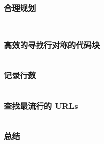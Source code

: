 \documentclass[./main.tex]{subfiles}
\begin{document}
\begin{lstlisting}[language=Haskell]

\end{lstlisting}

\subsubsection*{合理规划}

%

\begin{lstlisting}[language=Haskell]

\end{lstlisting}



\begin{lstlisting}[language=Haskell]

\end{lstlisting}

\subsubsection*{高效的寻找行对称的代码块}


\begin{lstlisting}[language=Haskell]

\end{lstlisting}

\subsubsection*{记录行数}

%

\begin{lstlisting}[language=Haskell]

\end{lstlisting}

\subsubsection*{查找最流行的 URLs}

%

\begin{lstlisting}[language=Haskell]

\end{lstlisting}

\subsubsection*{总结}

%
\end{document}

